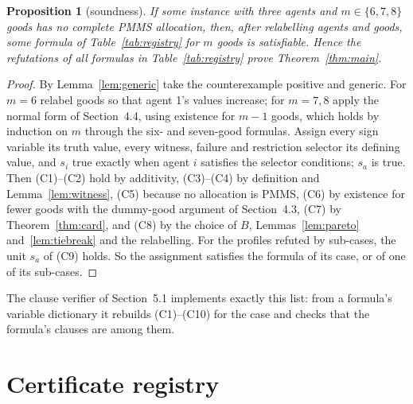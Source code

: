 \documentclass[11pt,a4paper]{article}
\newtheorem{proposition}[theorem]{Proposition}
\theoremstyle{remark}
\begin{document}
\begin{proposition}[soundness]\label{prop:sound}
If some instance with three agents and $m\in\{6,7,8\}$ goods has no complete PMMS allocation, then, after relabelling agents and goods, some formula of Table~\ref{tab:registry} for $m$ goods is satisfiable. Hence the refutations of all formulas in Table~\ref{tab:registry} prove Theorem~\ref{thm:main}.
\end{proposition}

\begin{proof}
By Lemma~\ref{lem:generic} take the counterexample positive and generic. For $m=6$ relabel goods so that agent 1's values increase; for $m=7,8$ apply the normal form of Section~4.4, using existence for $m-1$ goods, which holds by induction on $m$ through the six- and seven-good formulas. Assign every sign variable its truth value, every witness, failure and restriction selector its defining value, and $s_i$ true exactly when agent $i$ satisfies the selector conditions; $s_a$ is true. Then (C1)--(C2) hold by additivity, (C3)--(C4) by definition and Lemma~\ref{lem:witness}, (C5) because no allocation is PMMS, (C6) by existence for fewer goods with the dummy-good argument of Section~4.3, (C7) by Theorem~\ref{thm:card}, and (C8) by the choice of $B$, Lemmas~\ref{lem:pareto} and~\ref{lem:tiebreak} and the relabelling. For the profiles refuted by sub-cases, the unit $s_a$ of (C9) holds. So the assignment satisfies the formula of its case, or of one of its sub-cases.
\end{proof}

The clause verifier of Section~5.1 implements exactly this list: from a formula's variable dictionary it rebuilds (C1)--(C10) for the case and checks that the formula's clauses are among them.

\section{Certificate registry}\label{app:registry}
\end{document}
